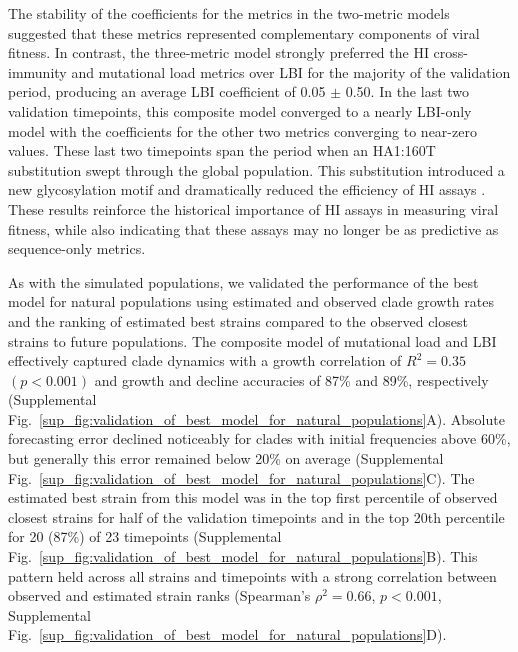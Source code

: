 The stability of the coefficients for the metrics in the two-metric models suggested that these metrics represented complementary components of viral fitness.
In contrast, the three-metric model strongly preferred the HI cross-immunity and mutational load metrics over LBI for the majority of the validation period, producing an average LBI coefficient of 0.05 $\pm$ 0.50.
In the last two validation timepoints, this composite model converged to a nearly LBI-only model with the coefficients for the other two metrics converging to near-zero values.
These last two timepoints span the period when an HA1:160T substitution swept through the global population.
This substitution introduced a new glycosylation motif and dramatically reduced the efficiency of HI assays \cite{Zost2017}.
These results reinforce the historical importance of HI assays in measuring viral fitness, while also indicating that these assays may no longer be as predictive as sequence-only metrics.

As with the simulated populations, we validated the performance of the best model for natural populations using estimated and observed clade growth rates and the ranking of estimated best strains compared to the observed closest strains to future populations.
The composite model of mutational load and LBI effectively captured clade dynamics with a growth correlation of $R^2 = 0.35$~$(p < 0.001)$ and growth and decline accuracies of 87\% and 89\%, respectively (Supplemental Fig.~\ref{sup_fig:validation_of_best_model_for_natural_populations}A).
Absolute forecasting error declined noticeably for clades with initial frequencies above 60\%, but generally this error remained below 20\% on average (Supplemental Fig.~\ref{sup_fig:validation_of_best_model_for_natural_populations}C).
The estimated best strain from this model was in the top first percentile of observed closest strains for half of the validation timepoints and in the top 20th percentile for 20 (87\%) of 23 timepoints (Supplemental Fig.~\ref{sup_fig:validation_of_best_model_for_natural_populations}B).
This pattern held across all strains and timepoints with a strong correlation between observed and estimated strain ranks (Spearman's $\rho^2 = 0.66$, $p < 0.001$, Supplemental Fig.~\ref{sup_fig:validation_of_best_model_for_natural_populations}D).

